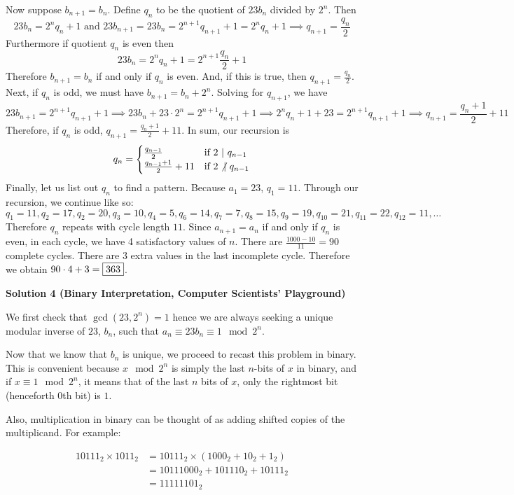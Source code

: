 \begin{enumerate}
 Now suppose $b_{n+1} = b_n$. Define $q_n$ to be the quotient of $23b_n$ divided by $2^n$. Then
 \[23b_n = 2^n q_n + 1 \text{ and } 23b_{n+1} = 23b_n = 2^{n+1} q_{n+1} + 1 = 2^n q_n + 1 \implies q_{n+1} = \frac{q_n}{2}\]Furthermore if quotient $q_n$ is even then
 \[23b_n = 2^n q_n +1 = 2^{n+1} \frac{q_n}{2} +1\]Therefore $b_{n+1} = b_n$ if and only if $q_n$ is even. And, if this is true, then $q_{n+1} = \frac{q_n}{2}$. Next, if $q_n$ is odd, we must have $b_{n+1} = b_n + 2^n$. Solving for $q_{n+1}$, we have
 \[23b_{n+1} = 2^{n+1} q_{n+1} + 1 \implies 23b_n + 23 \cdot 2^n = 2^{n+1} q_{n+1} + 1 \implies 2^n q_n + 1 + 23 = 2^{n+1} q_{n+1} + 1 \implies q_{n+1} = \frac{q_n + 1}{2} + 11\]Therefore, if $q_n$ is odd, $q_{n+1} = \frac{q_n + 1}{2} + 11$. In sum, our recursion is 
 \[q_n = \begin{cases} \frac{q_{n-1}}{2} & \text{if } 2 \text{ } \vert \text{ } q_{n-1} \\ \frac{q_{n-1}+1}{2} + 11 &\text{if } 2 \not\vert \text{ } q_{n-1} \end{cases}\]Finally, let us list out $q_n$ to find a pattern. Because $a_1 = 23$, $q_1 = 11$. Through our recursion, we continue like so:
 \[q_1 = 11, q_2 = 17, q_2 = 20, q_3 = 10, q_4 = 5, q_6 = 14, q_7 = 7, q_8 = 15, q_9 = 19, q_{10} = 21, q_{11} = 22, q_{12} = 11, \dots\]Therefore $q_n$ repeats with cycle length $11$. Since $a_{n+1} = a_n$ if and only if $q_n$ is even, in each cycle, we have 4 satisfactory values of $n$. There are $\frac{1000 - 10}{11} = 90$ complete cycles. There are 3 extra values in the last incomplete cycle. Therefore we obtain $90 \cdot 4 + 3 = \fbox{363}$.

 



\textbf{Solution 4 (Binary Interpretation, Computer Scientists' Playground)}

We first check that $\gcd(23, 2^n) = 1$ hence we are always seeking a unique modular inverse of $23$, $b_n$, such that $a_n \equiv 23b_n \equiv 1 \mod{2^n}$.

 
Now that we know that $b_n$ is unique, we proceed to recast this problem in binary. This is convenient because $x \mod{2^n}$ is simply the last $n$-bits of $x$ in binary, and if $x \equiv 1 \mod{2^n}$, it means that of the last $n$ bits of $x$, only the rightmost bit (henceforth $0$th bit) is $1$.

 Also, multiplication in binary can be thought of as adding shifted copies of the multiplicand. For example:

 
 \begin{align} 10111_2 \times 1011_2 &= 10111_2 \times (1000_2 + 10_2 + 1_2) \\               &= 10111000_2 + 101110_2 + 10111_2 \\               &= 11111101_2 \end{align}


\end{enumerate}
